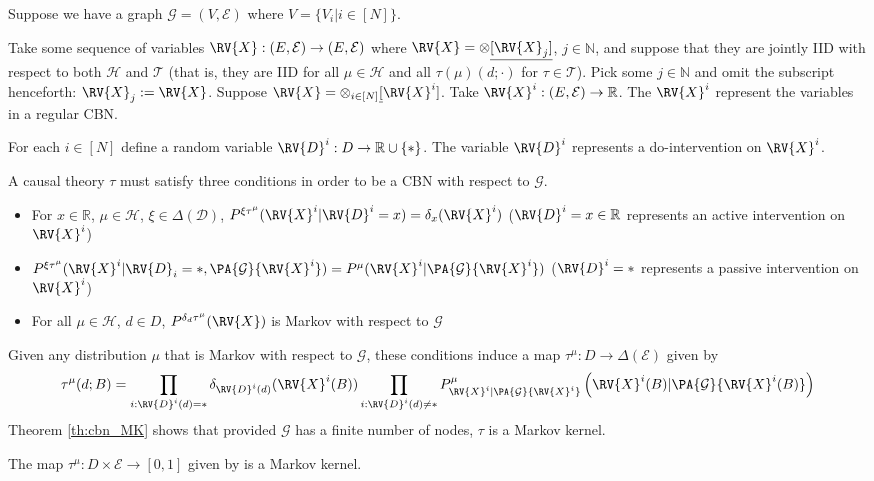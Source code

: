 Suppose we have a graph $\mathcal{G}=(V,\mathscr{E})$ where $V=\{V_i|i\in [N]\}$.

Take some sequence of variables $\RV{X}:(E,\mathcal{E})\to (E,\mathcal{E})$ where $\RV{X} = \otimes\underline{[\RV{X}_j]}$, $j\in \mathbb{N}$, and suppose that they are jointly IID with respect to both $\mathscr{H}$ and $\mathscr{T}$ (that is, they are IID for all $\mu\in\mathscr{H}$ and all  $\tau(\mu)(d;\cdot)$ for $\tau \in \mathscr{T}$). Pick some $j\in \mathbb{N}$ and omit the subscript henceforth: $\RV{X}_j:=\RV{X}$. Suppose $\RV{X} = \otimes_{i\in[N]}\underline[\RV{X}^i]$. Take $\RV{X}^i:(E,\mathcal{E})\to \mathbb{R}$. The $\RV{X}^i$ represent the variables in a regular CBN.

For each $i\in [N]$ define a random variable $\RV{D}^i:D\to \mathbb{R}\cup\{*\}$. The variable $\RV{D}^i$ represents a do-intervention on $\RV{X}^i$.

A causal theory $\tau$ must satisfy three conditions in order to be a CBN with respect to $\mathcal{G}$.

\begin{itemize}
    \item For $x\in \mathbb{R}$, $\mu\in \mathscr{H}$, $\xi\in \Delta(\mathcal{D})$,  $P^{\xi \tau^\mu}(\RV{X}^i|\RV{D}^i=x)=\delta_x(\RV{X}^i)$ ($\RV{D}^i=x\in \mathbb{R}$ represents an active intervention on $\RV{X}^i$)
    \item $P^{\xi \tau^\mu}(\RV{X}^i|\RV{D}_i=*,\PA{\mathcal{G}}{\RV{X}^i}) = P^\mu(\RV{X}^i|\PA{\mathcal{G}}{\RV{X}^i})$ ($\RV{D}^i=*$ represents a passive intervention on $\RV{X}^i$)
    \item For all $\mu\in \mathscr{H}$, $d\in D$, $P^{\delta_d \tau^\mu}(\RV{X})$ is Markov with respect to $\mathcal{G}$
\end{itemize}

Given any distribution $\mu$ that is Markov with respect to $\mathcal{G}$, these conditions induce a map $\tau^\mu:D\to \Delta(\mathcal{E})$ given by\cite{pearl_causality:_2009}
\begin{align}
    \tau^\mu(d;B) = \prod_{i:\RV{D}^i(d)=*} \delta_{\RV{D}^i(d)} (\RV{X}^i(B)) \prod_{i:\RV{D}^i(d)\neq *} P^{\mu}_{\RV{X}^i|\PA{\mathcal{G}}{\RV{X}^i}} \left(\RV{X}^i(B)|\PA{\mathcal{G}}{\RV{X}^i(B)}\right)
\end{align}
Theorem \ref{th:cbn_MK} shows that provided $\mathcal{G}$ has a finite number of nodes, $\tau$ is a Markov kernel.

\begin{theorem}\label{th:cbn_MK}
The map $\tau^\mu:D\times \mathcal{E}\to [0,1]$ given by  is a Markov kernel.
\end{theorem}

